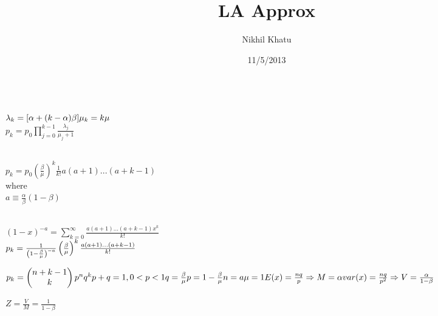 \documentclass{article}
\begin{document}
\title{LA Approx}
\author{Nikhil Khatu}
\date{11/5/2013}
\maketitle


\\
$
\lambda_k = [\alpha + (k - \alpha) \beta]\\
\mu_k = k\mu\\
$
\\
$
p_k = p_0\prod_{j=0}^{k-1} \frac{\lambda_j}{\mu_j + 1}
$


\\
$
p_k = p_0\left(\frac{\beta}{\mu}\right)^k \frac{1}{k!}a(a + 1) ... (a + k - 1)
$
\\
where\\
$
a \equiv \frac{\alpha}{\beta}(1 - \beta)
$

\\
$
(1-x)^{-a} = \sum_{k=0}^\infty \frac{a(a + 1) ... (a + k - 1)x^k}{k!}
$
\\
$
p_k = \frac{1}{\left(1 - \frac{\beta}{\mu}\right)^{-a}} \left(\frac{\beta}{\mu}\right)^k \frac{a(a + 1) ... (a + k - 1)}{k!}\\
$


$
p_k = \begin{pmatrix}n + k - 1\\k\end{pmatrix} p^nq^k\\
p+q = 1, 0 < p < 1 \\
q = \frac{\beta}{\mu}\\
p = 1 - \frac{\beta}{\mu}\\
n = a\\
\mu = 1\\
E(x) = \frac{nq}{p} \Rightarrow M = \alpha\\
var(x) = \frac{nq}{p^2} \Rightarrow V = \frac{\alpha}{1 - \beta}
$

$
Z = \frac{V}{M} = \frac{1}{1-\beta}
$
\end{document}
